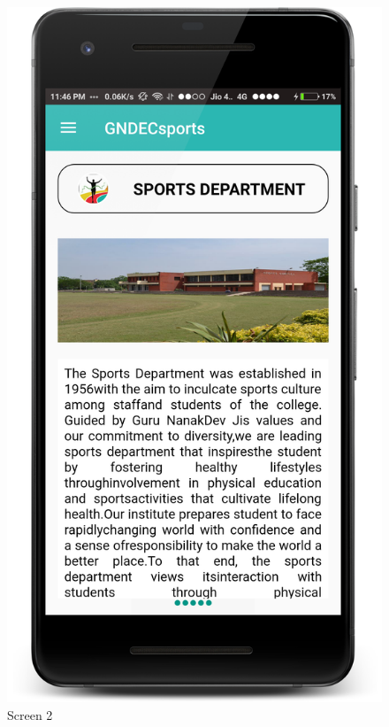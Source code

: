 \begin{figure}[ht]
\centering
\includegraphics[scale=0.13]{images/S2.png}
\caption{Screen 2}
\end{figure}

\newpage

